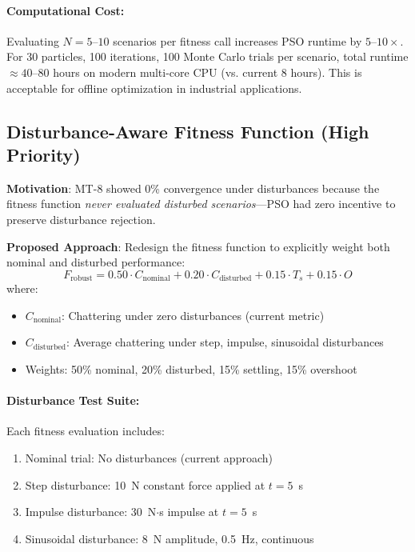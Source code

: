 \paragraph{Computational Cost:}
Evaluating $N = 5$--$10$ scenarios per fitness call increases PSO runtime by $5$--$10\times$. For 30 particles, 100 iterations, 100 Monte Carlo trials per scenario, total runtime $\approx 40$--80 hours on modern multi-core CPU (vs. current 8 hours). This is acceptable for offline optimization in industrial applications.

\subsection{Disturbance-Aware Fitness Function (High Priority)}
\label{sec:conclusions_disturbance_fitness}

\textbf{Motivation}: MT-8 showed 0\% convergence under disturbances because the fitness function \textit{never evaluated disturbed scenarios}—PSO had zero incentive to preserve disturbance rejection.

\textbf{Proposed Approach}: Redesign the fitness function to explicitly weight both nominal and disturbed performance:
\begin{equation}
    F_{\text{robust}} = 0.50 \cdot C_{\text{nominal}} + 0.20 \cdot C_{\text{disturbed}} + 0.15 \cdot T_s + 0.15 \cdot O
    \label{eq:conclusions_disturbance_fitness}
\end{equation}
where:
\begin{itemize}
    \item $C_{\text{nominal}}$: Chattering under zero disturbances (current metric)
    \item $C_{\text{disturbed}}$: Average chattering under step, impulse, sinusoidal disturbances
    \item Weights: 50\% nominal, 20\% disturbed, 15\% settling, 15\% overshoot
\end{itemize}

\paragraph{Disturbance Test Suite:}
Each fitness evaluation includes:
\begin{enumerate}
    \item Nominal trial: No disturbances (current approach)
    \item Step disturbance: 10~N constant force applied at $t = 5$~s
    \item Impulse disturbance: 30~N$\cdot$s impulse at $t = 5$~s
    \item Sinusoidal disturbance: 8~N amplitude, 0.5~Hz, continuous
\end{enumerate}

